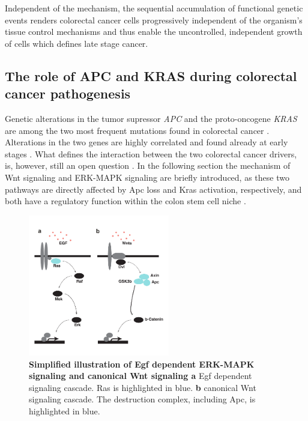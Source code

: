\begin{flushleft}
Independent of the mechanism, the sequential accumulation of functional genetic events renders colorectal cancer cells progressively independent of the organism's tissue control mechanisms and thus enable the uncontrolled, independent growth of cells which defines late stage cancer.

\subsection{The role of APC and KRAS during colorectal cancer pathogenesis}
Genetic alterations in the tumor supressor \textit{APC} and the proto-oncogene \textit{KRAS} are among the two most frequent mutations found in colorectal cancer \citep{markowitzMolecularOriginsCancer2009}. Alterations in the two genes are highly correlated and found already at early stages \citep{minaConditionalSelectionGenomic2017}. What defines the interaction between the two colorectal cancer drivers, is, however, still an open question \citep{parsonsWNTDriverDependency2021}. In the following section the mechanism of Wnt signaling and ERK-MAPK signaling are briefly introduced, as these two pathways are directly affected by Apc loss and Kras activation, respectively, and both have a regulatory function within the colon stem cell niche \citep{hTalesCryptNew2019}.

\begin{figure}[h]
\centering
\includegraphics[width=0.55\textwidth,
                keepaspectratio]{figures/adenomaprofiling/pdf/fig_0_1.pdf}
\caption[Simplified illustration of ERK-MAPK signaling and canonical Wnt signaling]{\textbf{Simplified illustration of Egf dependent ERK-MAPK signaling and canonical Wnt signaling a} Egf dependent signaling cascade. Ras is highlighted in blue. \textbf{b} canonical Wnt signaling cascade. The destruction complex, including Apc, is highlighted in blue.}
\label{fig_180}
\end{figure}
\bigbreak


\end{flushleft}
